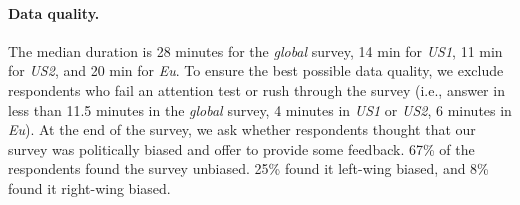\begin{bibunit}
\begin{small}
\paragraph{\small Data quality.} %
The median duration is 28 minutes for the \textit{global} survey, 14 min for \textit{US1}, 11 min for \textit{US2}, and 20 min for \textit{Eu}. To ensure the best possible data quality, we exclude respondents who fail an attention test or rush through the survey (i.e., answer in less than 11.5 minutes in the \textit{global} survey, 4 minutes in \textit{US1} or \textit{US2}, 6 minutes in \textit{Eu}). %
At the end of the survey, we ask whether respondents thought that our survey was politically biased and offer to provide some feedback. 67\% of the respondents found the survey unbiased. 25\% found it left-wing biased, and 8\% found it right-wing biased.




\end{small}
\end{bibunit}

